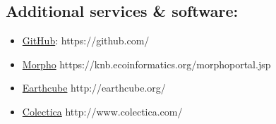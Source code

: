 \documentclass{tufte-handout}
\begin{document}
\subsection{Additional services \& software:}\label{additional-services-software}

\begin{itemize}
\item
  \href{https://github.com/}{GitHub}: https://github.com/
\item
  \href{https://knb.ecoinformatics.org/morphoportal.jsp}{Morpho}
  https://knb.ecoinformatics.org/morphoportal.jsp 
\item
  \href{http://earthcube.org/}{Earthcube} http://earthcube.org/
\item
  \href{http://www.colectica.com/}{Colectica} http://www.colectica.com/
\end{itemize}
\end{document}
